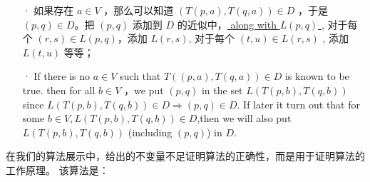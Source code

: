 \begin{itemize}
    \item [·] 如果存在 $a\in V$ ，那么可以知道 $ ( T(p,a), T(q,a) )  \in D $ ，于是 $ (p,q) \in D $。把 $( p,q )$ 添加到 $D$ 的近似中，\uline{ along with $ L(p,q) $ }, 对于每个 $ (r,s) \in L(p,q) $，添加 $ L(r,s) $, 对于每个 $ (t,u) \in L(r,s) $ , 添加 $ L(t,u) $ 等等；
    \item [·] If there is no $a \in V$ such that $ T((p,a),T(q,a)) \in D $ is known to be true. then for all $ b\in V$ ，we put $ (p,q) $ in the set $ L( T(p,b),T (q,b) ) $ since $ L( T(p,b),T (q,b) ) \in D \Rightarrow (p,q) \in D $. If later it turn out that for some $ b \in V , L( T(p,b),T (q,b) ) \in D$,then we will also put $ L( T(p,b),T (q,b) ) $ (including $ (p,q) $) in $D$.
\end{itemize}
在我们的算法展示中，给出的不变量不足证明算法的正确性，而是用于证明算法的工作原理。 该算法是：

